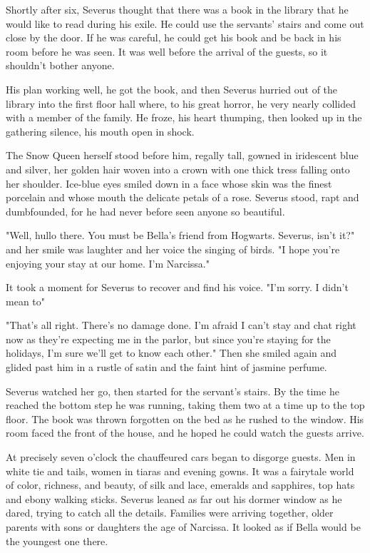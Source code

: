 Shortly after six, Severus thought that there was a book in the library that he would like to read during his exile. He could use the servants' stairs and come out close by the door. If he was careful, he could get his book and be back in his room before he was seen. It was well before the arrival of the guests, so it shouldn't bother anyone.

His plan working well, he got the book, and then Severus hurried out of the library into the first floor hall where, to his great horror, he very nearly collided with a member of the family. He froze, his heart thumping, then looked up in the gathering silence, his mouth open in shock.

The Snow Queen herself stood before him, regally tall, gowned in iridescent blue and silver, her golden hair woven into a crown with one thick tress falling onto her shoulder. Ice-blue eyes smiled down in a face whose skin was the finest porcelain and whose mouth the delicate petals of a rose. Severus stood, rapt and dumbfounded, for he had never before seen anyone so beautiful.

"Well, hullo there. You must be Bella's friend from Hogwarts. Severus, isn't it?" and her smile was laughter and her voice the singing of birds. "I hope you're enjoying your stay at our home. I'm Narcissa."

It took a moment for Severus to recover and find his voice. "I'm{\el} sorry. I{\el} didn't mean{\el} to{\el}"

"That's all right. There's no damage done. I'm afraid I can't stay and chat right now as they're expecting me in the parlor, but since you're staying for the holidays, I'm sure we'll get to know each other." Then she smiled again and glided past him in a rustle of satin and the faint hint of jasmine perfume.

Severus watched her go, then started for the servant's stairs. By the time he reached the bottom step he was running, taking them two at a time up to the top floor. The book was thrown forgotten on the bed as he rushed to the window. His room faced the front of the house, and he hoped he could watch the guests arrive.

At precisely seven o'clock the chauffeured cars began to disgorge guests. Men in white tie and tails, women in tiaras and evening gowns. It was a fairytale world of color, richness, and beauty, of silk and lace, emeralds and sapphires, top hats and ebony walking sticks. Severus leaned as far out his dormer window as he dared, trying to catch all the details. Families were arriving together, older parents with sons or daughters the age of Narcissa. It looked as if Bella would be the youngest one there.

